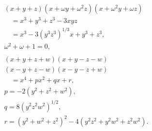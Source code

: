 \begin{align*}
&
(x+y+z)(x+\omega y+\omega^2 z)(x+\omega^2 y+\omega z)
\\ & \quad
=x^3+y^3+z^3-3xyz
\\ & \quad
=x^3-3(y^3z^3)^{1/3}x+y^3+z^3,
\\ &
\omega^2+\omega+1=0,
\\
\\ &
(x+y+z+w)(x+y-z-w)
\\ &
(x-y+z-w)(x-y-z+w)
\\ & \quad
=x^4+px^2+qx+r,
\\ &
p=-2(y^2+z^2+w^2),
\\ &
q=8(y^2z^2w^2)^{1/2},
\\ &
r=(y^2+w^2+z^2)^2-4(y^2 z^2+y^2 w^2+z^2 w^2).
\end{align*}
